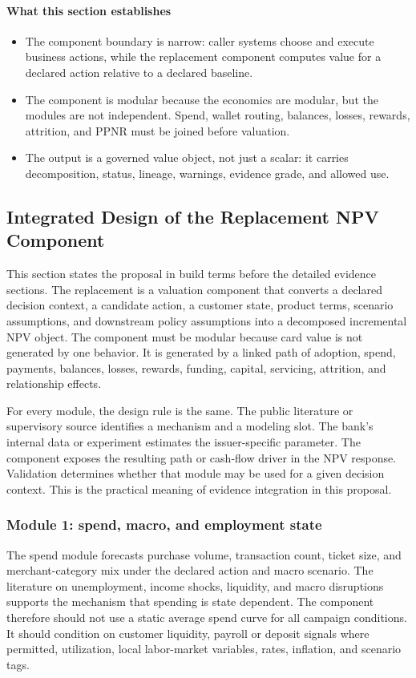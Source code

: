 \documentclass[11pt]{article}
\newcommand{\1}{\mathbf{1}}
\newcommand{\readerbox}[2]{\paragraph{#1}\begin{itemize}[leftmargin=1.5em,itemsep=0.1em,topsep=0.15em]#2\end{itemize}}
\begin{document}
\readerbox{What this section establishes}{
  \item The component boundary is narrow: caller systems choose and execute
        business actions, while the replacement component computes value for a
        declared action relative to a declared baseline.
  \item The component is modular because the economics are modular, but the
        modules are not independent. Spend, wallet routing, balances, losses,
        rewards, attrition, and PPNR must be joined before valuation.
  \item The output is a governed value object, not just a scalar: it carries
        decomposition, status, lineage, warnings, evidence grade, and allowed
        use.
}

\subsection{Integrated Design of the Replacement NPV Component}
\label{sec:integrated-design}

This section states the proposal in build terms before the detailed evidence
sections. The replacement is a valuation component that converts a declared
decision context, a candidate action, a customer state, product terms,
scenario assumptions, and downstream policy assumptions into a decomposed
incremental NPV object. The component must be modular because card value is
not generated by one behavior. It is generated by a linked path of adoption,
spend, payments, balances, losses, rewards, funding, capital, servicing,
attrition, and relationship effects.

For every module, the design rule is the same. The public literature or
supervisory source identifies a mechanism and a modeling slot. The bank's
internal data or experiment estimates the issuer-specific parameter. The
component exposes the resulting path or cash-flow driver in the NPV response.
Validation determines whether that module may be used for a given decision
context. This is the practical meaning of evidence integration in this
proposal.

\subsubsection{Module 1: spend, macro, and employment state}
\label{subsec:module-spend-macro}

The spend module forecasts purchase volume, transaction count, ticket size,
and merchant-category mix under the declared action and macro scenario. The
literature on unemployment, income shocks, liquidity, and macro disruptions
supports the mechanism that spending is state dependent. The component
therefore should not use a static average spend curve for all campaign
conditions. It should condition on customer liquidity, payroll or deposit
signals where permitted, utilization, local labor-market variables, rates,
inflation, and scenario tags.
\end{document}
